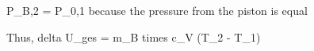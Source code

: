 P_B,2 = P_0,1 because the pressure from the piston is equal  

Thus, delta U_ges = m_B times c_V (T_2 - T_1)
